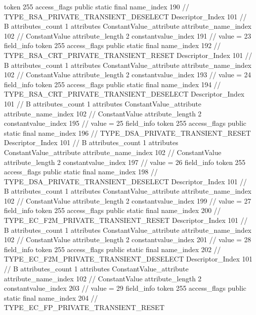 {{{{{				token	255
				access_flags	public static final
				name_index	190		// TYPE_RSA_PRIVATE_TRANSIENT_DESELECT
				Descriptor_Index	101		// B
				attributes_count	1
				attributes {
				ConstantValue_attribute {
					attribute_name_index	102		// ConstantValue
					attribute_length	2
					constantvalue_index	191		// value = 23
				}
				}
			}
			field_info {
				token	255
				access_flags	public static final
				name_index	192		// TYPE_RSA_CRT_PRIVATE_TRANSIENT_RESET
				Descriptor_Index	101		// B
				attributes_count	1
				attributes {
				ConstantValue_attribute {
					attribute_name_index	102		// ConstantValue
					attribute_length	2
					constantvalue_index	193		// value = 24
				}
				}
			}
			field_info {
				token	255
				access_flags	public static final
				name_index	194		// TYPE_RSA_CRT_PRIVATE_TRANSIENT_DESELECT
				Descriptor_Index	101		// B
				attributes_count	1
				attributes {
				ConstantValue_attribute {
					attribute_name_index	102		// ConstantValue
					attribute_length	2
					constantvalue_index	195		// value = 25
				}
				}
			}
			field_info {
				token	255
				access_flags	public static final
				name_index	196		// TYPE_DSA_PRIVATE_TRANSIENT_RESET
				Descriptor_Index	101		// B
				attributes_count	1
				attributes {
				ConstantValue_attribute {
					attribute_name_index	102		// ConstantValue
					attribute_length	2
					constantvalue_index	197		// value = 26
				}
				}
			}
			field_info {
				token	255
				access_flags	public static final
				name_index	198		// TYPE_DSA_PRIVATE_TRANSIENT_DESELECT
				Descriptor_Index	101		// B
				attributes_count	1
				attributes {
				ConstantValue_attribute {
					attribute_name_index	102		// ConstantValue
					attribute_length	2
					constantvalue_index	199		// value = 27
				}
				}
			}
			field_info {
				token	255
				access_flags	public static final
				name_index	200		// TYPE_EC_F2M_PRIVATE_TRANSIENT_RESET
				Descriptor_Index	101		// B
				attributes_count	1
				attributes {
				ConstantValue_attribute {
					attribute_name_index	102		// ConstantValue
					attribute_length	2
					constantvalue_index	201		// value = 28
				}
				}
			}
			field_info {
				token	255
				access_flags	public static final
				name_index	202		// TYPE_EC_F2M_PRIVATE_TRANSIENT_DESELECT
				Descriptor_Index	101		// B
				attributes_count	1
				attributes {
				ConstantValue_attribute {
					attribute_name_index	102		// ConstantValue
					attribute_length	2
					constantvalue_index	203		// value = 29
				}
				}
			}
			field_info {
				token	255
				access_flags	public static final
				name_index	204		// TYPE_EC_FP_PRIVATE_TRANSIENT_RESET
}}}}}

